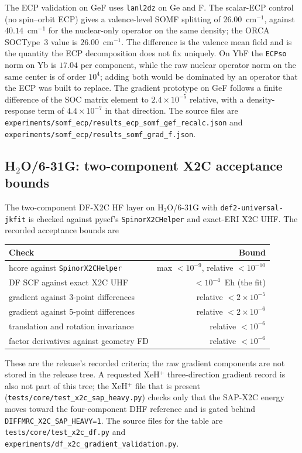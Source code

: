 The ECP validation on GeF uses \texttt{lanl2dz} on Ge and F.  The
scalar-ECP control (no spin--orbit ECP) gives a valence-level SOMF
splitting of $26.00$~cm$^{-1}$, against $40.14$~cm$^{-1}$ for the
nuclear-only operator on the same density; the ORCA SOCType~3 value is
$26.00$~cm$^{-1}$.  The difference is the valence mean field and is the
quantity the ECP decomposition does not fix uniquely.
On YbF the \texttt{ECPso} norm on Yb is $17.04$ per component, while
the raw nuclear operator norm on the same center is of order
$10^{4}$; adding both would be dominated by an operator that the ECP
was built to replace.  The gradient prototype on GeF follows a finite
difference of the SOC matrix element to $2.4\times10^{-5}$ relative,
with a density-response term of $4.4\times10^{-7}$ in that direction.
The source files are
\texttt{experiments/somf\_ecp/results\_ecp\_somf\_gef\_recalc.json} and
\texttt{experiments/somf\_ecp/results\_somf\_grad\_f.json}.

\subsection{H\texorpdfstring{$_2$}{2}O/6-31G: two-component X2C
acceptance bounds}

The two-component DF-X2C HF layer on H$_2$O/6-31G with
\texttt{def2-universal-jkfit} is checked against pyscf's
\texttt{SpinorX2CHelper} and exact-ERI X2C UHF.  The recorded
acceptance bounds are
\begin{center}
\small
\begin{tabular}{lr}
\toprule
Check & Bound \\
\midrule
hcore against \texttt{SpinorX2CHelper} & max $<10^{-9}$, relative $<10^{-10}$ \\
DF SCF against exact X2C UHF & $<10^{-4}$~Eh (the fit) \\
gradient against 3-point differences & relative $<2\times10^{-5}$ \\
gradient against 5-point differences & relative $<2\times10^{-6}$ \\
translation and rotation invariance & relative $<10^{-6}$ \\
factor derivatives against geometry FD & relative $<10^{-6}$ \\
\bottomrule
\end{tabular}
\end{center}
These are the release's recorded criteria; the raw gradient components
are not stored in the release tree.  A requested XeH$^{+}$
three-direction gradient record is also not part of this tree; the
XeH$^{+}$ file that is present
(\texttt{tests/core/test\_x2c\_sap\_heavy.py}) checks only that the
SAP-X2C energy moves toward the four-component DHF reference and is
gated behind \texttt{DIFFMRC\_X2C\_SAP\_HEAVY=1}.  The source files for
the table are \texttt{tests/core/test\_x2c\_df.py} and
\texttt{experiments/df\_x2c\_gradient\_validation.py}.

